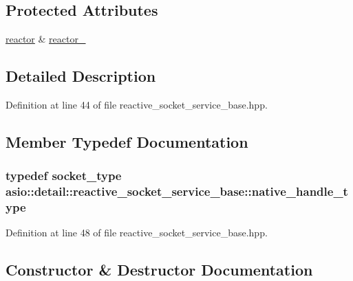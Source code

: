 \subsection*{Protected Attributes}
\begin{DoxyCompactItemize}
\item 
\hyperlink{namespaceasio_1_1detail_a84c582743740f1d6b19111c88e2922bd}{reactor} \& \hyperlink{classasio_1_1detail_1_1reactive__socket__service__base_a487bbc9ae7bffc0df3c2eb0cf9d09f60}{reactor\+\_\+}
\end{DoxyCompactItemize}


\subsection{Detailed Description}


Definition at line 44 of file reactive\+\_\+socket\+\_\+service\+\_\+base.\+hpp.



\subsection{Member Typedef Documentation}
\hypertarget{classasio_1_1detail_1_1reactive__socket__service__base_a7838f400a17a0a3e0fd1c78040f4da53}{}
\subsubsection[{native\+\_\+handle\+\_\+type}]{\setlength{\rightskip}{0pt plus 5cm}typedef {\bf socket\+\_\+type} {\bf asio\+::detail\+::reactive\+\_\+socket\+\_\+service\+\_\+base\+::native\+\_\+handle\+\_\+type}}\label{classasio_1_1detail_1_1reactive__socket__service__base_a7838f400a17a0a3e0fd1c78040f4da53}


Definition at line 48 of file reactive\+\_\+socket\+\_\+service\+\_\+base.\+hpp.



\subsection{Constructor \& Destructor Documentation}
\hypertarget{classasio_1_1detail_1_1reactive__socket__service__base_aac49e07e6f0b7d6ec3b9a1daf30dd1cd}{}

